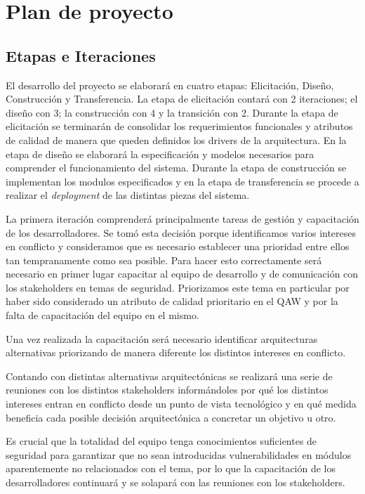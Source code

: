 \section{Plan de proyecto}

\subsection{Etapas e Iteraciones}

El desarrollo del proyecto se elaborar\'a en cuatro etapas: Elicitación, Diseño, Construcción y Transferencia. La etapa de elicitación contar\'a con 2 iteraciones; el diseño con 3; la construcción con 4 y la transición con 2. Durante la etapa de elicitación se terminar\'an de consolidar los requerimientos funcionales y atributos de calidad de manera que queden definidos los drivers de la arquitectura. En la etapa de diseño se elaborar\'a la especificación y modelos necesarios para comprender el funcionamiento del sistema. Durante la etapa de construcción se implementan los modulos especificados y en la etapa de transferencia se procede a realizar el \textit{deployment} de las distintas piezas del sistema.  
\\ \par
La primera iteración comprenderá principalmente tareas de gestión y capacitación de los desarrolladores. Se tomó esta decisión porque identificamos varios intereses en conflicto y consideramos que es necesario establecer una prioridad entre ellos tan tempranamente como sea posible. Para hacer esto correctamente será necesario en primer lugar capacitar al equipo de desarrollo y de comunicación con los stakeholders en temas de seguridad. Priorizamos este tema en particular por haber sido considerado un atributo de calidad prioritario en el QAW y por la falta de capacitación del equipo en el mismo. 
\\ \par
Una vez realizada la capacitación será necesario identificar arquitecturas alternativas priorizando de manera diferente los distintos intereses en conflicto.
\\ \par
Contando con distintas alternativas arquitectónicas se realizará una serie de reuniones con los distintos stakeholders informándoles por qué los distintos intereses entran en conflicto desde un punto de vista tecnológico y en qué medida beneficia cada posible decisión arquitectónica a concretar un objetivo u otro.
\\ \par
Es crucial que la totalidad del equipo tenga conocimientos suficientes de seguridad para garantizar que no sean introducidas vulnerabilidades en módulos aparentemente no relacionados con el tema, por lo que la capacitación de los desarrolladores continuará y se solapará con las reuniones con los stakeholders. 

